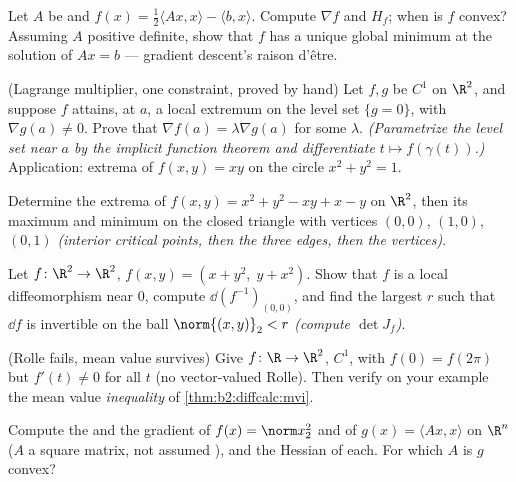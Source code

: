 \begin{exercise}[$\star\star$]\label{exo:b2:diffcalc:5}
Let $A$ be  and $f(x) = \frac12\langle Ax, x\rangle -
\langle b, x\rangle$. Compute $\nabla f$ and $H_f$; when is $f$
convex? Assuming $A$ positive definite, show that $f$ has a unique
global minimum at the solution of $Ax = b$ --- gradient descent's
raison d'\^etre.
\end{exercise}

\begin{exercise}[$\star\star$]\label{exo:b2:diffcalc:6}
(Lagrange multiplier, one constraint, proved by hand) Let $f, g$ be
$C^1$ on $\R^2$, and suppose $f$ attains, at $a$, a local extremum
on the level set $\{g = 0\}$, with $\nabla g(a) \neq 0$. Prove that
$\nabla f(a) = \lambda\nabla g(a)$ for some $\lambda$.
\emph{(Parametrize the level set near $a$ by the implicit function
theorem and differentiate $t \mapsto f(\gamma(t))$.)} Application:
extrema of $f(x,y) = xy$ on the circle $x^2 + y^2 = 1$.
\end{exercise}

\begin{exercise}[$\star\star$]\label{exo:b2:diffcalc:7}
Determine the extrema of $f(x, y) = x^2 + y^2 - xy + x - y$ on
$\R^2$, then its maximum and minimum on the closed triangle with
vertices $(0,0)$, $(1,0)$, $(0,1)$ \emph{(interior critical points,
then the three edges, then the vertices)}.
\end{exercise}

\begin{exercise}[$\star\star\star$]\label{exo:b2:diffcalc:8}
Let $f \colon \R^2 \to \R^2$, $f(x, y) = (x + y^2,\; y + x^2)$.
Show that $f$ is a local diffeomorphism near $0$, compute
$\dd(f^{-1})_{(0,0)}$, and find the largest $r$ such that $\dd f$
is invertible on the ball $\norm{(x,y)}_2 < r$ \emph{(compute
$\det J_f$)}.
\end{exercise}

\begin{exercise}[$\star\star\star$]\label{exo:b2:diffcalc:9}
(Rolle fails, mean value survives) Give $f \colon \R \to \R^2$,
$C^1$, with $f(0) = f(2\pi)$ but $f'(t) \neq 0$ for all $t$
(no vector-valued Rolle). Then verify on your example the
mean value \emph{inequality} of \cref{thm:b2:diffcalc:mvi}.
\end{exercise}

\begin{exercise}[$\star$]\label{exo:b2:diffcalc:10}
Compute the  and the gradient of $f(x) = \norm
x_2^2$ and of $g(x) = \langle Ax, x\rangle$ on $\R^n$ ($A$ a
square matrix, not assumed ), and the Hessian of each.
For which $A$ is $g$ convex?
\end{exercise}

